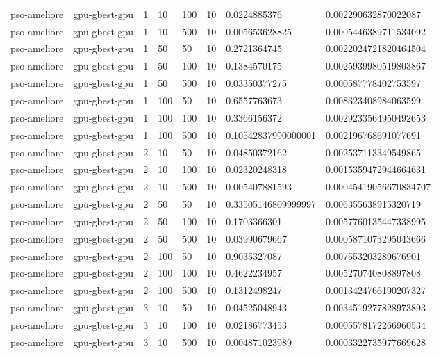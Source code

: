 \begin{table}[t]
\begin{tabular}{llllllll}
pso-ameliore & gpu-gbest-gpu & 1 & 10 & 100 & 10 & 0.0224885376 & 0.002290632870022087 \\
pso-ameliore & gpu-gbest-gpu & 1 & 10 & 500 & 10 & 0.005653628825 & 0.0005446389711534092 \\
pso-ameliore & gpu-gbest-gpu & 1 & 50 & 50 & 10 & 0.2721364745 & 0.0022024721820464504 \\
pso-ameliore & gpu-gbest-gpu & 1 & 50 & 100 & 10 & 0.1384570175 & 0.0025939980519803867 \\
pso-ameliore & gpu-gbest-gpu & 1 & 50 & 500 & 10 & 0.03350377275 & 0.000587778402753597 \\
pso-ameliore & gpu-gbest-gpu & 1 & 100 & 50 & 10 & 0.6557763673 & 0.008323408984063599 \\
pso-ameliore & gpu-gbest-gpu & 1 & 100 & 100 & 10 & 0.3366156372 & 0.0029233564950492653 \\
pso-ameliore & gpu-gbest-gpu & 1 & 100 & 500 & 10 & 0.10542837990000001 & 0.002196768691077691 \\
pso-ameliore & gpu-gbest-gpu & 2 & 10 & 50 & 10 & 0.04850372162 & 0.002537113349549865 \\
pso-ameliore & gpu-gbest-gpu & 2 & 10 & 100 & 10 & 0.02320248318 & 0.0015359472944664631 \\
pso-ameliore & gpu-gbest-gpu & 2 & 10 & 500 & 10 & 0.005407881593 & 0.00045419056670834707 \\
pso-ameliore & gpu-gbest-gpu & 2 & 50 & 50 & 10 & 0.33505146809999997 & 0.006355638915320719 \\
pso-ameliore & gpu-gbest-gpu & 2 & 50 & 100 & 10 & 0.1703366301 & 0.0057760135447338995 \\
pso-ameliore & gpu-gbest-gpu & 2 & 50 & 500 & 10 & 0.03990679667 & 0.0005871073295043666 \\
pso-ameliore & gpu-gbest-gpu & 2 & 100 & 50 & 10 & 0.9035327087 & 0.007553203289676901 \\
pso-ameliore & gpu-gbest-gpu & 2 & 100 & 100 & 10 & 0.4622234957 & 0.005270740808897808 \\
pso-ameliore & gpu-gbest-gpu & 2 & 100 & 500 & 10 & 0.1312498247 & 0.0013424766190207327 \\
pso-ameliore & gpu-gbest-gpu & 3 & 10 & 50 & 10 & 0.04525048943 & 0.0034519277828973893 \\
pso-ameliore & gpu-gbest-gpu & 3 & 10 & 100 & 10 & 0.02186773453 & 0.0005578172266960534 \\
pso-ameliore & gpu-gbest-gpu & 3 & 10 & 500 & 10 & 0.004871023989 & 0.0003322735977669628 \\

\end{tabular}
\end{table}
